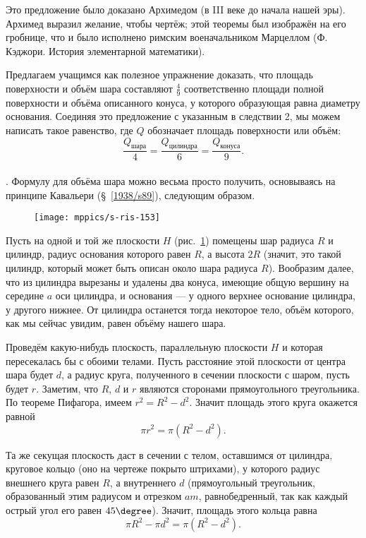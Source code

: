 Это предложение было доказано Архимедом (в III веке до начала нашей эры).
Архимед выразил желание, чтобы чертёж;
этой теоремы был изображён на его гробнице, что и было исполнено римским военачальником Марцеллом (Ф. Кэджори. История элементарной математики).

Предлагаем учащимся как полезное упражнение доказать, что площадь поверхности и объём шара составляют $\tfrac49$ соответственно площади полной поверхности и объёма описанного конуса, у которого образующая равна диаметру основания.
Соединяя это предложение с указанным в следствии 2, мы можем написать такое равенство, где $Q$ обозначает площадь поверхности или объём:
\[\frac{Q_{\text{шара}}}4
=\frac{Q_{\text{цилиндра}}}6
=\frac{Q_{\text{конуса}}}9.
\]

{\small

\paragraph{}\label{1938/s147}
.
Формулу для объёма шара можно весьма просто получить, основываясь на принципе Кавальери (§~\ref{1938/s89}), следующим образом.

\begin{figure}[!ht]
\vskip-0mm
\centering
\texttt{[image: mppics/s-ris-153]}
\caption{}\label{1938/s-ris-153}
\vskip-0mm
\end{figure}

Пусть на одной и той же плоскости $H$ (рис.~\ref{1938/s-ris-153}) помещены шар радиуса $R$ и цилиндр, радиус основания которого равен $R$, а высота $2R$ (значит, это такой цилиндр, который может быть описан около шара радиуса $R$).
Вообразим далее, что из цилиндра вырезаны и удалены два конуса, имеющие общую вершину на середине $a$ оси цилиндра, и основания — у одного верхнее основание цилиндра, у другого нижнее.
От цилиндра останется тогда некоторое тело, объём которого, как мы сейчас увидим, равен объёму нашего шара.

Проведём какую-нибудь плоскость, параллельную плоскости $H$ и которая пересекалась бы с обоими телами.
Пусть расстояние этой плоскости от центра шара будет $d$, а радиус круга, полученного в сечении плоскости с шаром, пусть будет $r$.
Заметим, что $R$, $d$ и $r$ являются сторонами прямоугольного треугольника.
По теореме Пифагора, имеем $r^2=R^2-d^2$.
Значит площадь этого круга окажется равной 
\[\pi r^2 = \pi (R^2 - d^2).\]

Та же секущая плоскость даст в сечении с телом, оставшимся от цилиндра, круговое кольцо (оно на чертеже покрыто штрихами), у которого радиус внешнего круга равен $R$, а внутреннего $d$ (прямоугольный треугольник, образованный этим радиусом и отрезком $am$, равнобедренный, так как каждый острый угол его равен $45\degree$).
Значит, площадь этого кольца равна 
\[\pi R^2 - \pi d^2 = \pi(R^2 - d^2).\]

}
